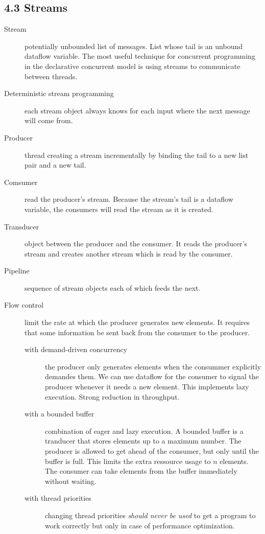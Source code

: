 \subsection{4.3 Streams}

\begin{description}
  \item[Stream] potentially unbounded list of messages.
    List whose tail is an unbound dataflow variable.
    The most useful technique for concurrent programming in the declarative concurrent model is using streams to communicate between threads.
  \item[Deterministic stream programming] each stream object always knows for each input where the next message will come from.
  \item[Producer] thread creating a stream incrementally by binding the tail to a new list pair and a new tail.
  \item[Comsumer] read the producer's stream.
    Because the stream's tail is a dataflow variable, the consumers will read the stream as it is created.
  \item[Transducer] object between the producer and the consumer.
    It reads the producer's stream and creates another stream which is read by the consumer.
  \item[Pipeline] sequence of stream objects each of which feeds the next.
  \item[Flow control] limit the rate at which the producer generates new elements.
    It requires that some information be sent back from the consumer to the producer.
    \begin{description}
      \item[with demand-driven concurrency] the producer only generates elements when the consummer explicitly demandes them.
        We can use dataflow for the consumer to signal the producer whenever it needs a new element.
        This implements lazy execution.
        Strong reduction in throughput.
      \item[with a bounded buffer] combination of eager and lazy execution.
        A bounded buffer is a tranducer that stores elements up to a maximum number.
        The producer is allowed to get ahead of the consumer, but only until the buffer is full.
        This limits the extra ressource usage to $n$ elements.
        The consumer can take elements from the buffer immediately without waiting.
      \item[with thread priorities] changing thread priorities \emph{should never be used} to get a program to work correctly but only in case of performance optimization.
    \end{description}


\end{description}
